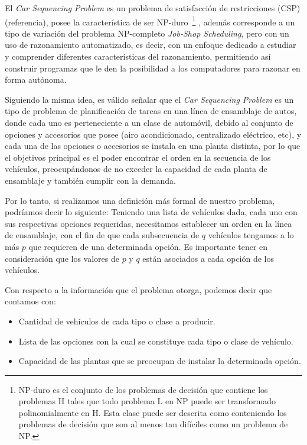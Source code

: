 %

El \emph{Car Sequencing Problem} es un problema de satisfacción de restricciones (CSP) (referencia), posee la
característica de ser NP-duro~\footnote{
NP-duro es el conjunto de los problemas de decisión que contiene los problemas H
tales que todo problema L en NP puede ser transformado polinomialmente en H.
Esta clase puede ser descrita como conteniendo los problemas de decisión que son
al menos tan difíciles como un problema de NP.}
, además corresponde a un tipo de variación del problema NP-completo \emph{Job-Shop Scheduling},
pero con un uso de razonamiento automatizado, es decir, con un enfoque dedicado a estudiar y comprender
diferentes características del razonamiento, permitiendo así construir programas que le den la posibilidad
a los computadores para razonar en forma autónoma.
 
Siguiendo la misma idea, es válido señalar que el \emph{Car Sequencing Problem} es un tipo de problema de planificación
de tareas en una línea de ensamblaje de autos, donde cada uno es perteneciente a un clase de automóvil, debido al conjunto
de opciones y accesorios que posee (airo acondicionado, centralizado eléctrico, etc), y cada una de las opciones o
accesorios se instala en una planta distinta, por lo que el objetivos principal es el poder encontrar el orden en la
secuencia de los vehículos, preocupándonos de no exceder la capacidad de cada planta de ensamblaje y también cumplir con la demanda.

Por lo tanto, si realizamos una definición más formal de nuestro problema, podríamos decir lo siguiente:
Teniendo una lista de vehículos dada, cada uno con sus respectivas opciones requeridas,
necesitamos establecer un orden en la línea de ensamblaje, con el fin de que cada subsecuencia de $q$ vehículos
tengamos a lo más $p$ que requieren de una determinada opción. Es importante tener en consideración que los
valores de $p$ y $q$ están asociados a cada opción de los vehículos.

Con respecto a la información que el problema otorga, podemos decir que contamos con:
\begin{itemize}
	\item Cantidad de vehículos de cada tipo o clase a producir.
	\item Lista de las opciones con la cual se constituye cada tipo o clase de vehículo.
	\item Capacidad de las plantas que se preocupan de instalar la determinada opción.
\end{itemize}

